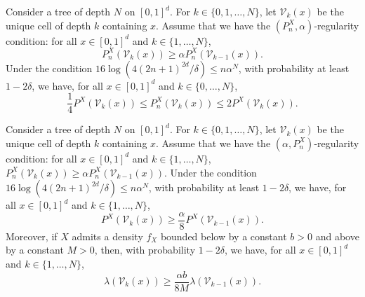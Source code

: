 \documentclass[10pt,a4paper]{amsart}
\begin{document}
\begin{lemma}\label{lemmaWager0}
Consider a tree of depth $N$ on $[0,1]^d$. For $k \in  \{0,1,\dots,N \}$, let $\mathcal{V}_k(x)$ be the unique cell of depth $k$ containing $x$. Assume that we have the $( P^X_n,\alpha)$-regularity condition: for all $x\in [0,1]^d$ and  $k \in \{1,\ldots,  N\} $, $$  P_n^X(\mathcal{V}_{k}(x))  \ge \alpha P_n^X(\mathcal{V}_{k-1}(x)).$$ 
Under the condition $16\log( 4 (2n+1)^{2d} / \delta) \leq n \alpha^{N}$, with probability at least $1 - 2\delta$,  we have, for all $x\in [0,1]^d$ and $k \in  \{0,\dots,N \}$, 
$$  \frac{1}{ 4}    P ^X (\mathcal{V}_{k}(x))  \leq  P^X_n(\mathcal{V}_{k}(x))\leq 2 P^X (\mathcal{V}_{k}(x)) . $$
\end{lemma}

\begin{lemma}\label{lemmaWager_new}
Consider a tree of depth $N$ on $[0,1]^d$. For $k \in  \{0,1,\dots,N \}$, let $\mathcal{V}_k(x)$ be the unique cell of depth $k$ containing $x$.
 Assume that we have the $(\alpha,P_n^X)$-regularity condition: for all $x\in [0,1]^d$ and  $k \in \{1,\ldots,  N\} $, 
$  P_n^X(\mathcal{V}_{k}(x))  \ge \alpha P_n^X(\mathcal{V}_{k-1}(x))$. Under the condition $16\log( 4 (2n+1)^{2d} / \delta) \leq n \alpha^{N}$, with probability at least $1 - 2\delta$,  we have, for all $x\in [0,1]^d$ and $k \in  \{1,\dots,N \}$, 
\begin{equation*}
 P^X(\mathcal{V}_{k}(x))  \ge \frac{\alpha}{8} P^X(\mathcal{V}_{k-1}(x)).    
\end{equation*}
Moreover, if $X$ admits a density $f_X$ bounded below by a constant $b > 0$ and above by a constant $M > 0$, then, with probability $1-2\delta$,  we have, for all $x\in [0,1]^d$ and $k \in  \{1,\dots,N \}$, 
$$  \lambda(\mathcal{V}_{k}(x)) \geq \frac{\alpha b}{8M} \lambda(\mathcal{V}_{k-1}(x)) .$$
\end{lemma}
\end{document}
